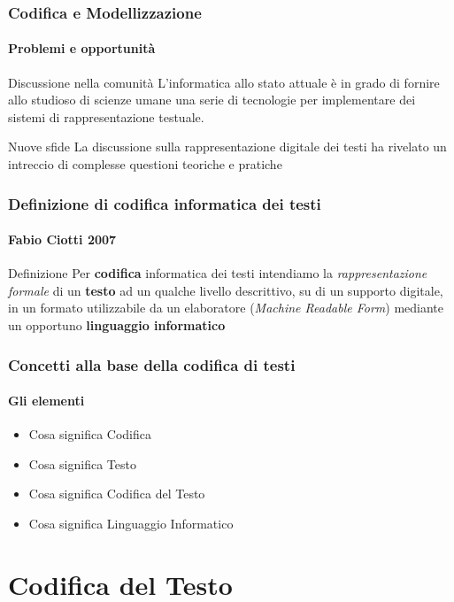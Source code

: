 \documentclass{beamer}
\begin{document}
\begin{frame}
	\frametitle{Codifica e Modellizzazione}
	\framesubtitle{Problemi e opportunità}
	\addtocounter{nframe}{1}

	\begin{block}{Discussione nella comunità}
		L'informatica allo stato attuale è in grado di fornire allo studioso di scienze umane una serie di tecnologie per implementare dei sistemi di rappresentazione testuale.
	\end{block}

	\begin{block}{Nuove sfide}
		La discussione sulla rappresentazione digitale dei testi ha rivelato un intreccio di complesse questioni teoriche e pratiche
	\end{block}

\end{frame}

\begin{frame}
	\frametitle{Definizione di codifica informatica dei testi}
	\framesubtitle{Fabio Ciotti 2007}
	\addtocounter{nframe}{1}

	\begin{block}{Definizione}
		Per \textbf{codifica} informatica dei testi intendiamo la \textit{rappresentazione formale} di un \textbf{testo} ad un qualche livello descrittivo, su di un supporto digitale, in un formato utilizzabile da un elaboratore (\textit{Machine Readable Form}) mediante un opportuno \textbf{linguaggio informatico}
	\end{block}

\end{frame}


\begin{frame}
	\frametitle{Concetti alla base della codifica di testi}
	\framesubtitle{Gli elementi}
	\addtocounter{nframe}{1}

    \begin{itemize}
        \item Cosa significa Codifica
        \item Cosa significa Testo
        \item Cosa significa Codifica del Testo
        \item Cosa significa Linguaggio Informatico
    \end{itemize}

\end{frame}

\section{Codifica del Testo}

\end{document}
